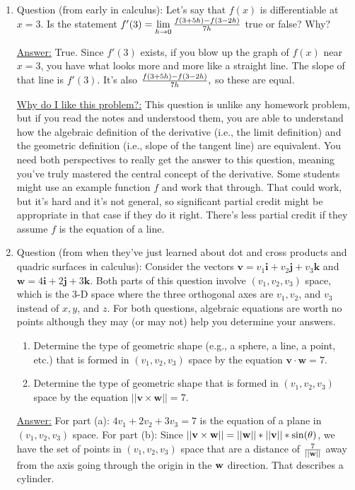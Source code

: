 \documentclass[12pt]{article}
\begin{document}
\begin{enumerate}

\item Question (from early in calculus): Let's say that $f(x)$ is differentiable at $x=3.$ Is the statement $f^{\prime }(3)=\lim\limits_{h\rightarrow 0}\frac{%
f(3+5h)-f(3-2h)}{7h}$ true or false? Why?

\underline{Answer:} True. Since $f'(3)$ exists, if you blow up the graph of $f(x)$ near $x=3$, you have what looks more and more like a straight line. The slope of that line is $f'(3)$. It's also $\frac{%
f(3+5h)-f(3-2h)}{7h},$ so these are equal.

\underline{Why do I like this problem?:}  This question is unlike any homework problem, but if you read the notes and understood them, you are able to understand how the algebraic definition of the derivative (i.e., the limit definition) and the geometric definition (i.e., slope of the tangent line) are equivalent. You need both perspectives to really get the answer to this question, meaning you've truly mastered the central concept of the derivative. Some students might use an example function $f$ and work that through. That could work, but it's hard and it's not general, so significant partial credit might be appropriate in that case if they do it right. There's less partial credit if they assume $f$ is the equation of a line.


\item Question (from when they've just learned about dot and cross products and quadric surfaces in calculus): Consider the vectors $\mathbf{v} = v_1\mathbf{i} + v_2\mathbf{j} +v_3\mathbf{k}$ and  $\mathbf{w} = 4\mathbf{i} + 2\mathbf{j} +3\mathbf{k}$. Both parts of this question involve $(v_1, v_2, v_3)$ space, which is the 3-D space where the three orthogonal axes are $v_1, v_2$, and $v_3$ instead of $x, y$, and $z$.  For both questions, algebraic equations are worth no points although they may (or may not) help you determine your answers.
	\begin{enumerate}
		\item Determine the type of geometric shape (e.g., a sphere, a line, a point, etc.) that is formed in $(v_1, v_2, v_3)$ space by the equation $\mathbf{v\cdot w}=7$.
		\item Determine the type of geometric shape that is formed in $(v_1, v_2, v_3)$ space by the equation $||\mathbf{v\times w}||=7$.
	\end{enumerate}

\underline{Answer:} For part (a): $4v_1 + 2v_2 + 3v_3 =7$ is the equation of a plane in $(v_1, v_2, v_3)$ space. For part (b): Since $||\mathbf{v\times w}|| = ||{\bf w}||*||{\bf v}||* \sin(\theta)$, we have the set of points in $(v_1, v_2, v_3)$ space that are a distance of $\frac{7}{||{\bf w}||}$ away from the axis going through the origin in the ${\bf w}$ direction. That describes a cylinder.


\end{enumerate}
\end{document}
